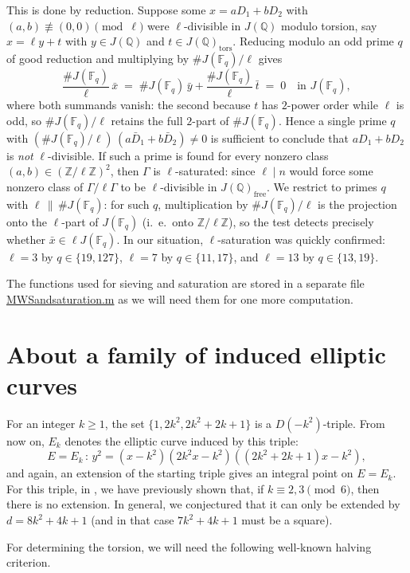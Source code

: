 \documentclass{article}
\theoremstyle{plain}
\newcommand{\Z}{\mathbb{Z}}
\newcommand{\Q}{\mathbb{Q}}
\newcommand{\F}{\mathbb{F}}
\newcommand{\tors}{\mathrm{tors}}
\begin{document}
This is done by reduction. Suppose some $x=aD_1+bD_2$ with
$(a,b)\not\equiv(0,0)\pmod\ell$ were $\ell$-divisible in $J(\Q)$ modulo
torsion, say $x=\ell y+t$ with $y\in J(\Q)$ and
$t\in J(\Q)_{\tors}$. Reducing modulo an odd prime $q$ of good
reduction and multiplying by $\#J(\F_q)/\ell$ gives
\[
  \frac{\#J(\F_q)}{\ell}\,\bar x
  \;=\;\#J(\F_q)\,\bar y+\frac{\#J(\F_q)}{\ell}\,\bar t\;=\;0
  \quad\text{in } J(\F_q),
\]
where both summands vanish: the second because $t$ has $2$-power order while $\ell$ is odd, so $\#J(\F_q)/\ell$ retains the
full $2$-part of $\#J(\F_q)$. Hence a single prime $q$ with
$(\#J(\F_q)/\ell)\,(a\bar D_1+b\bar D_2)\neq 0$ is sufficient to conclude that
$aD_1+bD_2$ is \emph{not} $\ell$-divisible. If such a prime is found for
every nonzero class $(a,b)\in(\Z/\ell\Z)^2$, then $\Gamma$ is $\ell$-saturated: since $\ell\mid n$ would force some nonzero class of $\Gamma/\ell\Gamma$ to be
$\ell$-divisible in $J(\Q)_{\mathrm{free}}$.
We restrict to primes $q$ with $\ell\,\|\,\#J(\F_q)$: for such $q$,
multiplication by $\#J(\F_q)/\ell$ is the projection onto
the $\ell$-part of $J(\F_q)$ (i.~e.~onto \( \Z/\ell\Z\)), so the test detects precisely whether
$\bar x\in\ell J(\F_q)$.
In our situation, \(\ell\)-saturation was quickly confirmed:
$\ell=3$ by $q\in\{19,127\}$, $\ell=7$ by $q\in\{11,17\}$, and
$\ell=13$ by $q\in\{13,19\}$.

\medskip
The functions used for sieving and saturation are stored in a separate file \href{https://github.com/NikolaAdzaga/TorsionRegularTriples/blob/main/MWS_and_saturation.m}{MWS\textunderscore and\textunderscore saturation.m} as we will need them for one more computation.

\section{About a family of induced elliptic curves}
For an integer \(k\geqslant 1\), the set \(\{1,2k^2,2k^2+2k+1\}\) is a
\(D(-k^2)\)-triple. From now on, \(E_k\) denotes the elliptic curve induced
by this triple:
\[ E=E_k \, : \, y^2=(x-k^2)(2k^2x-k^2)((2k^2+2k+1)x-k^2), \]
and again, an extension of the starting triple gives an integral point on $E=E_k$. For this triple, in \cite{AF}, we have previously shown that, if $k\equiv 2, 3 \pmod{6}$, then there is no extension. In general, we conjectured that it can only be extended by $d=8k^2+4k+1$ (and in that case $7k^2+4k+1$ must be a square).

For determining the torsion, we will need the following well-known halving criterion.
\end{document}
